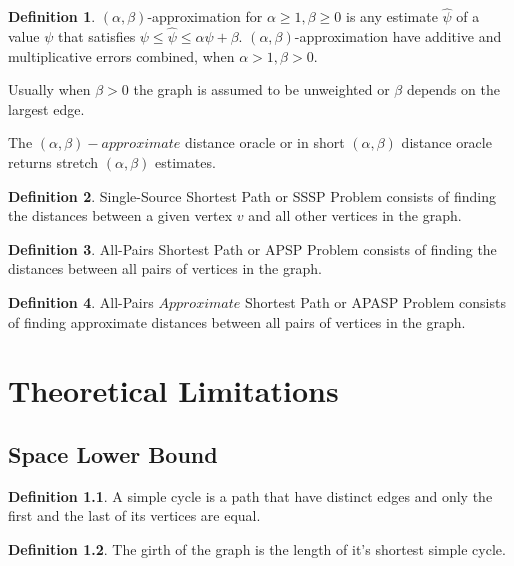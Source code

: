 \documentclass[shortabstract, lic, english]{iithesis}
\theoremstyle{definition} \newtheorem{definition}{Definition}[chapter]
\theoremstyle{remark} \newtheorem{remark}[definition]{Observation}
\theoremstyle{plain} \newtheorem{theorem}[definition]{Theorem}
\theoremstyle{plain} \newtheorem{lemma}[definition]{Lemma}
\theoremstyle{plain} \newtheorem{conjecture}[definition]{Conjecture}
\begin{document}
\begin{definition}
    $(\alpha, \beta)$-approximation for $\alpha \geq 1, \beta \geq 0$ is any estimate $\hat{\psi}$ of a value $\psi$ that satisfies $\psi \leq \hat{\psi} \leq \alpha\psi + \beta$.
    $(\alpha, \beta)$-approximation have additive and multiplicative errors combined, when $\alpha > 1, \beta > 0$.
\end{definition}
    Usually when $\beta > 0$ the graph is assumed to be unweighted or $\beta$ depends on the largest edge.

The $(\alpha,\beta)-approximate$ distance oracle or in short $(\alpha,\beta)$ distance oracle returns stretch $(\alpha,\beta)$ estimates.

\begin{definition}
    Single-Source Shortest Path or SSSP Problem consists of finding the distances between a given vertex $v$ and all other vertices in the graph. 
\end{definition}

\begin{definition}
    All-Pairs Shortest Path or APSP Problem consists of finding the distances between all pairs of vertices in the graph. 
\end{definition}

\begin{definition}
    All-Pairs $Approximate$ Shortest Path or APASP Problem consists of finding approximate distances between all pairs of vertices in the graph. 
\end{definition}

\chapter{Theoretical Limitations} \label{theoreticalLimitations}

\section{Space Lower Bound}
\begin{definition}
    A simple cycle is a path that have distinct edges and only the first and the last of its vertices are equal.
\end{definition}

\begin{definition} 
    The girth of the graph is the length of it's shortest simple cycle. 
\end{definition}
\end{document}
